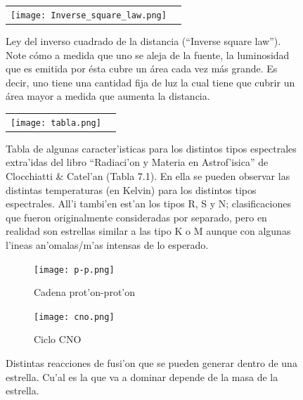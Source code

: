 \documentclass{article}
\begin{document}
\begin{figure}[!ht]
\begin{center}
\begin{tabular}{ll}
  \texttt{[image: Inverse\_square\_law.png]} 
\end{tabular}
\caption{{\small Ley del inverso cuadrado de la distancia (``Inverse square law''). Note cómo a medida que uno se aleja de la fuente, la luminosidad que es emitida por ésta cubre un área cada vez más grande. Es decir, uno tiene una cantidad fija de luz la cual tiene que cubrir un área mayor a medida que aumenta la distancia.}}\label{square_law}
\end{center} 
\end{figure}

\newpage

\begin{figure}[!ht]
\begin{center}
\begin{tabular}{ll}
  \texttt{[image: tabla.png]} 
\end{tabular}
\caption{{\small Tabla de algunas caracter'isticas para los distintos tipos espectrales extra'idas del libro ``Radiaci'on y Materia en Astrof'isica'' de Clocchiatti \& Catel'an (Tabla 7.1). En ella se pueden observar las distintas temperaturas (en Kelvin) para los distintos tipos espectrales. All'i tambi'en est'an los tipos R, S y N; clasificaciones que fueron originalmente consideradas por separado, pero en realidad son estrellas similar a las tipo K o M aunque con algunas l'ineas an'omalas/m'as intensas de lo esperado.}}\label{tabla}
\end{center} 
\end{figure}

\begin{figure}
\centering
  \begin{subfigure}{6cm}
    \centering\texttt{[image: p-p.png]}
    \caption{Cadena prot'on-prot'on}
  \end{subfigure}
  \begin{subfigure}{6cm}
    \centering\texttt{[image: cno.png]}
    \caption{Ciclo CNO}
  \end{subfigure}
  \caption{Distintas reacciones de fusi'on que se pueden generar dentro de una estrella. Cu'al es la que va a dominar depende de la masa de la estrella.}
\end{figure} 
\vspace{3mm}
\end{document}
